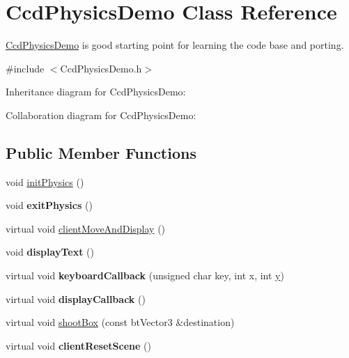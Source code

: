 \hypertarget{class_ccd_physics_demo}{\section{Ccd\+Physics\+Demo Class Reference}
\label{class_ccd_physics_demo}
}


\hyperlink{class_ccd_physics_demo}{Ccd\+Physics\+Demo} is good starting point for learning the code base and porting.  




{\ttfamily \#include $<$Ccd\+Physics\+Demo.\+h$>$}



Inheritance diagram for Ccd\+Physics\+Demo\+:


Collaboration diagram for Ccd\+Physics\+Demo\+:
\subsection*{Public Member Functions}
\begin{DoxyCompactItemize}
\item 
void \hyperlink{class_ccd_physics_demo_abaab502389d884fa5d4e1d2e8316d88b}{init\+Physics} ()
\item 
\hypertarget{class_ccd_physics_demo_ad3f131510d8cc33d391300fdc08d7290}{void {\bfseries exit\+Physics} ()}\label{class_ccd_physics_demo_ad3f131510d8cc33d391300fdc08d7290}

\item 
virtual void \hyperlink{class_ccd_physics_demo_ab87d8051510297348d9770d7e423258e}{client\+Move\+And\+Display} ()
\item 
\hypertarget{class_ccd_physics_demo_aab53e68f2ed0a58a72ffade268bd84b6}{void {\bfseries display\+Text} ()}\label{class_ccd_physics_demo_aab53e68f2ed0a58a72ffade268bd84b6}

\item 
\hypertarget{class_ccd_physics_demo_a8cc6d714dd240530ab9a437ce8178606}{virtual void {\bfseries keyboard\+Callback} (unsigned char key, int x, int \hyperlink{_ice_utils_8h_aa7ffaed69623192258fb8679569ff9ba}{y})}\label{class_ccd_physics_demo_a8cc6d714dd240530ab9a437ce8178606}

\item 
\hypertarget{class_ccd_physics_demo_ad80565425fc1c1a4d3a2ebffd127e947}{virtual void {\bfseries display\+Callback} ()}\label{class_ccd_physics_demo_ad80565425fc1c1a4d3a2ebffd127e947}

\item 
virtual void \hyperlink{class_ccd_physics_demo_aa0d503ae70a56c59bd14844563b2a77c}{shoot\+Box} (const bt\+Vector3 \&destination)
\item 
\hypertarget{class_ccd_physics_demo_a931879f220ba9fa51858cc0b7982ff26}{virtual void {\bfseries client\+Reset\+Scene} ()}\label{class_ccd_physics_demo_a931879f220ba9fa51858cc0b7982ff26}

\end{DoxyCompactItemize}
